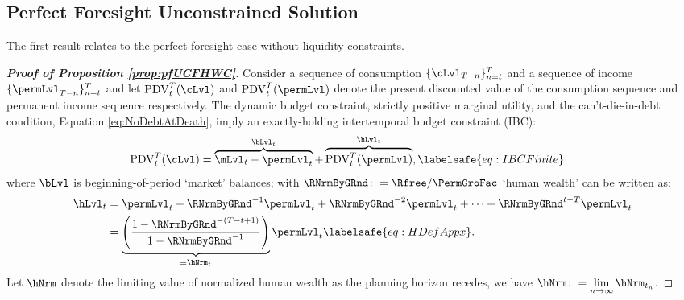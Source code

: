 \documentclass[\econtexRoot/BufferStockTheory]{subfiles}
\begin{document}
\subsection{Perfect Foresight Unconstrained Solution}\label{subsec:ApndxUCPF}

The first result relates to the perfect foresight case without liquidity constraints.


\begin{proof}[\textbf{Proof of Proposition \ref{prop:pfUCFHWC}}]
Consider a sequence of consumption $\{\cLvl_{T-n}\}_{n= t}^{T}$ and a sequence of income $\{\permLvl_{T-n}\}_{n= t}^{T}$  and let $\mathrm{PDV}_{t}^{T}(\cLvl)$  and $\mathrm{PDV}_{t}^{T}(\permLvl)$ denote the present discounted value of the consumption sequence and permanent income sequence respectively.
The dynamic budget constraint, strictly positive marginal utility, and the can't-die-in-debt condition, Equation \eqref{eq:NoDebtAtDeath}, imply an exactly-holding intertemporal budget constraint (IBC):
%
%
\begin{align}
  \mathrm{PDV}_{t}^{T}(\cLvl)  & = \overbrace{\mLvl_{t}-\permLvl_{t}}^{\bLvl_{t}}+\overbrace{\mathrm{PDV}_{t}^{T}(\permLvl)}^{\hLvl_{t}}, \labelsafe{eq:IBCFinite}
\end{align} \hypertarget{FHWFacDefn}{}\hypertarget{PFRNrmByGRndDefn}{}
where $\bLvl$ is beginning-of-period `market' balances; with $\RNrmByGRnd \colon = \Rfree/\PermGroFac$ `human wealth' can be written as:
%
% 
\begin{align}
  \hLvl_{t}  & = \permLvl_{t}+\RNrmByGRnd^{-1} \permLvl_{t} + \RNrmByGRnd^{-2} \permLvl_{t} + \cdots + \RNrmByGRnd^{t-T} \permLvl_{t} \notag
  \\  & = \underbrace{\left(\frac{1-\RNrmByGRnd^{-(T-t+1)}}{1-\RNrmByGRnd^{-1}}\right)}_{\equiv \hNrm_{t}}\permLvl_{t} \labelsafe{eq:HDefAppx}.
\end{align}
%
%
Let $\hNrm$ denote the limiting value of normalized human wealth as the planning horizon recedes, we have  $\hNrm \colon = \lim\limits_{n \rightarrow \infty} \hNrm_{t_{n}}$.



\end{proof}
\end{document}
